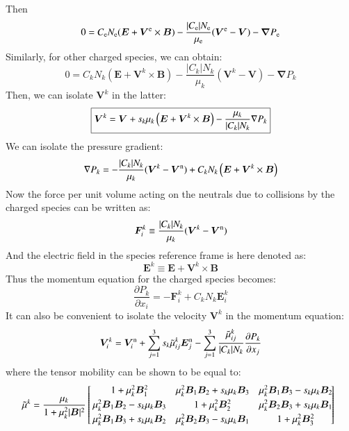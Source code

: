 \documentclass{warpdoc}
\newcommand\frameeqn[1]{\fbox{$\displaystyle #1$}}
\newcommand{\alb}{\vspace{0.1cm}\\} %
\newcommand{\mfd}{\displaystyle}
\renewcommand{\vec}[1]{\bm{#1}}
\begin{document}
%
Then
%
\begin{equation}
0= C_{\rm e} N_{\rm e} (\vec{E}+ \vec{V}^{\rm e} \times \vec{B}) - \frac{ |C_{\rm e}| N_{\rm e}}{\mu_{\rm e}}  (\vec{V}^{\rm e} - \vec{V}) - \vec{\nabla} P_{\rm e} 
\end{equation}
%
Similarly, for other charged species, we can obtain:
%
\begin{equation}
0= C_k N_k (\vec{E}+ \vec{V}^{k} \times \vec{B}) - \frac{ |C_k| N_k}{\mu_k}  (\vec{V}^k - \vec{V}) - \vec{\nabla} P_k 
\end{equation}
%
 Then, we can isolate $\vec{V}^k$ in the latter: 
%
\begin{equation}
\frameeqn{
  \vec{V}^k=\vec{V} + s_k \mu_k \left(\vec{E}+\vec{V}^k \times \vec{B}\right)-\frac{\mu_k}{|C_k| N_k}\nabla P_k
}
 \label{eqn:Vcharged}
\end{equation}
% 
We can isolate the pressure gradient:
%
\begin{equation}
\nabla P_k=
  -\frac{|C_k| N_k}{\mu_k}
(\vec{V}^k-\vec{V}^{\rm n})+C_k N_k \left(\vec{E}+\vec{V}^k \times \vec{B}\right)
\end{equation}
% 
Now the force per unit volume acting on the neutrals due to collisions by the charged species can be written as:
%
\begin{equation}
\vec{F}_i^k \equiv \frac{|C_k| N_k}{\mu_k} (\vec{V}^k-\vec{V}^{\rm n})
\end{equation}
%
And the electric field in the species reference frame is here denoted as:
%
\begin{equation}
\vec{E}^k \equiv \vec{E}+\vec{V}^k \times \vec{B}
\end{equation}
%
Thus the momentum equation for the charged species becomes:
%
\begin{equation}
  \frac{\partial P_k}{\partial x_i} = -\vec{F}_i^k + C_k N_k \vec{E}^k_i
 \label{eqn:nablaP}
\end{equation}
%
It can also be convenient to isolate the velocity $\vec{V}^k$ in the momentum equation: 
%
\begin{equation}
  \vec{V}^{k}_i = \vec{V}^{\rm n}_i+\sum_{j=1}^3 s_k \wtilde{\mu}^k_{ij}  \vec{E}_j^{\rm n}
             - \sum_{j=1}^3  \frac{\wtilde{\mu}^{k}_{ij}}{|C_k| N_k} \frac{\partial P_k}{\partial x_j}
  \label{eqn:V}
\end{equation}
%
where the tensor mobility can be shown to be equal to:
%
\begin{equation}
\!\!\!
\begin{array}{l}\mfd
\wtilde{\mu}^k  =\frac{\mu_k}{1+\mu_k^2|\vec{B}|^2}\left[\!\!\begin{array}{ccc} 
      1+\mu_k^2 \vec{B}_1^2 
     & \mu_k^2\vec{B}_1\vec{B}_2+s_k \mu_k \vec{B}_3  
     & \mu_k^2\vec{B}_1\vec{B}_3-s_k \mu_k \vec{B}_2 \alb
      \mu_k^2\vec{B}_1\vec{B}_2-s_k\mu_k\vec{B}_3 & 1+\mu_k^2\vec{B}_2^2 &  \mu_k^2\vec{B}_2\vec{B}_3+s_k\mu_k\vec{B}_1  \alb
      \mu_k^2\vec{B}_1\vec{B}_3 +s_k\mu_k\vec{B}_2 & \mu_k^2 \vec{B}_2\vec{B}_3-s_k\mu_k\vec{B}_1  & 1+\mu_k^2\vec{B}_3^2 
    \end{array} \!\!\!\!\right]
\end{array}
\label{eqn:mutilde}
\end{equation}
\end{document}
